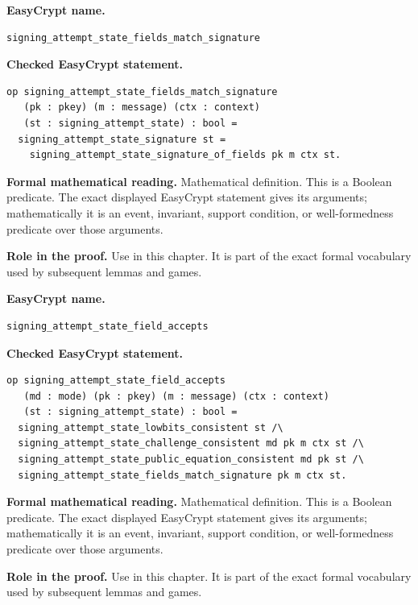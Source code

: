 \begin{formaldefinition}
\noindent\textbf{EasyCrypt name.}
\begin{lstlisting}[language=EasyCrypt,basicstyle=\ttfamily\scriptsize]
signing_attempt_state_fields_match_signature
\end{lstlisting}
\noindent\textbf{Checked EasyCrypt statement.}
\begin{lstlisting}[language=EasyCrypt,basicstyle=\ttfamily\scriptsize]
op signing_attempt_state_fields_match_signature
   (pk : pkey) (m : message) (ctx : context)
   (st : signing_attempt_state) : bool =
  signing_attempt_state_signature st =
    signing_attempt_state_signature_of_fields pk m ctx st.
\end{lstlisting}
\noindent\textbf{Formal mathematical reading.}
Mathematical definition. This is a Boolean predicate.  The exact displayed EasyCrypt statement gives its arguments; mathematically it is an event, invariant, support condition, or well-formedness predicate over those arguments.

\noindent\textbf{Role in the proof.}
Use in this chapter. It is part of the exact formal vocabulary used by subsequent lemmas and games.

\end{formaldefinition}

\begin{formaldefinition}
\noindent\textbf{EasyCrypt name.}
\begin{lstlisting}[language=EasyCrypt,basicstyle=\ttfamily\scriptsize]
signing_attempt_state_field_accepts
\end{lstlisting}
\noindent\textbf{Checked EasyCrypt statement.}
\begin{lstlisting}[language=EasyCrypt,basicstyle=\ttfamily\scriptsize]
op signing_attempt_state_field_accepts
   (md : mode) (pk : pkey) (m : message) (ctx : context)
   (st : signing_attempt_state) : bool =
  signing_attempt_state_lowbits_consistent st /\
  signing_attempt_state_challenge_consistent md pk m ctx st /\
  signing_attempt_state_public_equation_consistent md pk st /\
  signing_attempt_state_fields_match_signature pk m ctx st.
\end{lstlisting}
\noindent\textbf{Formal mathematical reading.}
Mathematical definition. This is a Boolean predicate.  The exact displayed EasyCrypt statement gives its arguments; mathematically it is an event, invariant, support condition, or well-formedness predicate over those arguments.

\noindent\textbf{Role in the proof.}
Use in this chapter. It is part of the exact formal vocabulary used by subsequent lemmas and games.

\end{formaldefinition}

